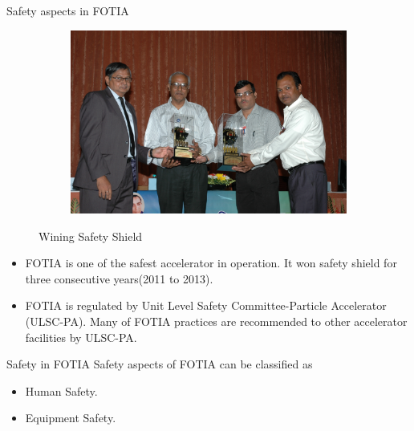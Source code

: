 \documentclass[11pt]{beamer}
\begin{document}
\begin{frame}{Safety aspects in FOTIA}

  \begin{figure}
        \centering
        \begin{subfigure}[b]{0.6\textwidth}
                \includegraphics[width=\textwidth]{DSC_0067.jpg}
        \end{subfigure}%
               
        \caption{Wining Safety Shield}\label{fig:Wining Safety Shield}
\end{figure}
  
   
  
  \begin{itemize}  
    \item FOTIA is one of the safest accelerator in operation. It won safety shield for three consecutive years(2011 to 2013).
    \item FOTIA is regulated by Unit Level Safety Committee-Particle Accelerator (ULSC-PA). Many of FOTIA practices are recommended to other accelerator facilities by ULSC-PA.           
   \end{itemize}

\end{frame}

\begin{frame}{Safety in FOTIA}
Safety aspects of FOTIA can be classified as 
 \begin{itemize} 
 \item Human Safety.
 \item Equipment Safety.
\end{itemize} 
\end{frame}
\end{document}
